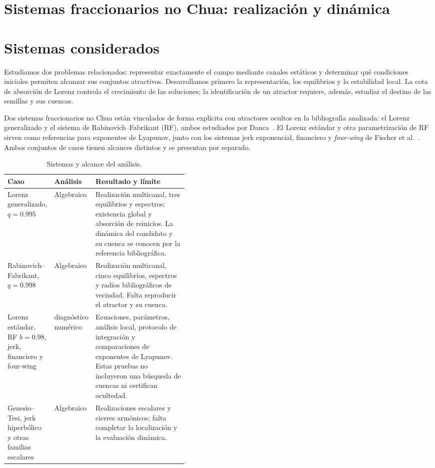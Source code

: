 \section[Candidatos fraccionarios no Chua]{Sistemas fraccionarios no Chua: realización y dinámica}
\label{part:nonchua}

\section{Sistemas considerados}

Estudiamos dos problemas relacionados: representar exactamente el campo
mediante canales estáticos y determinar qué condiciones iniciales permiten
alcanzar sus conjuntos atractivos. Desarrollamos primero la representación,
los equilibrios y la estabilidad local. La cota de absorción de Lorenz
controla el crecimiento de las soluciones; la identificación de un atractor
requiere, además, estudiar el destino de las semillas y sus cuencas.

Dos sistemas fraccionarios no Chua están vinculados de forma explícita con
atractores ocultos en la bibliografía analizada: el Lorenz generalizado y el
sistema de Rabinovich--Fabrikant (RF), ambos estudiados por
Danca~\cite{Danca2017}. El Lorenz estándar y otra
parametrización de RF sirven como referencias para exponentes de Lyapunov, junto con
los sistemas jerk exponencial, financiero y \emph{four-wing} de
Fischer et al.~\cite{fischer2020}. Ambos conjuntos de casos tienen alcances
distintos y se presentan por separado.

\begin{table}[ht]
\centering
\small
\caption{Sistemas y alcance del análisis.}
\begin{tabularx}{\linewidth}{>{\raggedright\arraybackslash}p{0.23\linewidth}
>{\raggedright\arraybackslash}p{0.19\linewidth}X}
\toprule
Caso & Análisis & Resultado y límite\\
\midrule
Lorenz generalizado, \(q=0.995\) & Algebraico &
Realización multicanal, tres equilibrios y espectros; existencia global y
absorción de reinicios. La dinámica del candidato y su cuenca se conocen
por la referencia bibliográfica.\\
Rabinovich--Fabrikant, \(q=0.998\) & Algebraico &
Realización multicanal, cinco equilibrios, espectros y radios bibliográficos
de vecindad. Falta reproducir el atractor y su cuenca.\\
Lorenz estándar, RF \(b=0.98\), jerk, financiero y four-wing & diagnóstico
numérico & Ecuaciones, parámetros, análisis local, protocolo de integración y
comparaciones de exponentes de Lyapunov. Estas pruebas no incluyeron una
búsqueda de cuencas ni certifican ocultedad.\\
Genesio--Tesi, jerk hiperbólico y otras familias escalares & Algebraico &
Realizaciones escalares y cierres armónicos; falta completar la localización
y la evaluación dinámica.\\
\bottomrule
\end{tabularx}
\end{table}

